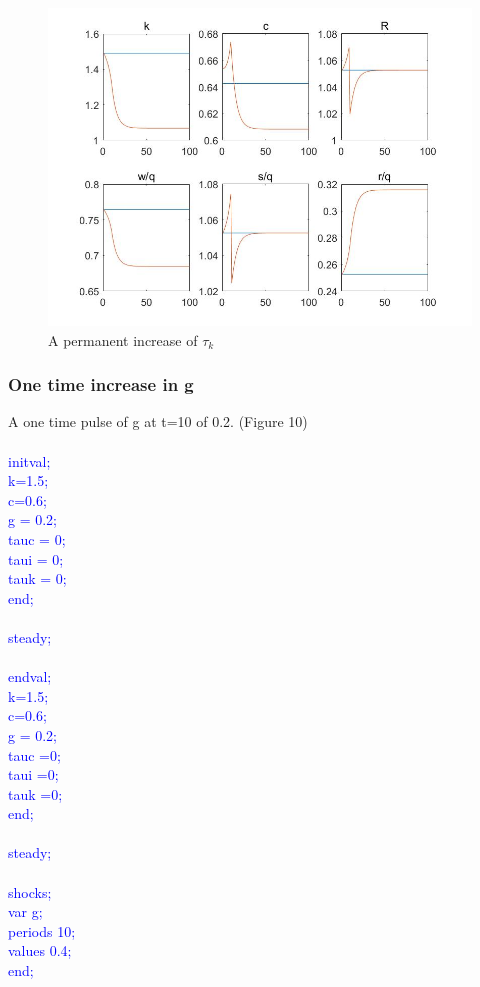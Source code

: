 \documentclass[a4paper,12pt]{scrartcl} %
\begin{document}
\begin{figure}[htbp!]
		\centering
			\includegraphics[width=0.8\linewidth]{fig9.jpg}
            \caption{A permanent increase of $\tau_k$}\label{9}
\end{figure}



\subsubsection{One time increase in g}

A one time pulse of g at t=10 of 0.2. (Figure 10)\\
\\
\textcolor{blue}{
initval;\\
k=1.5;\\
c=0.6;\\
g = 0.2;\\
tauc = 0;\\
taui = 0;\\
tauk = 0;\\
end;\\
\\
steady;\\
\\
endval;\\
k=1.5;\\
c=0.6;\\
g = 0.2;\\
tauc =0;\\
taui =0;\\
tauk =0;\\
end;\\
\\
steady;\\
\\
shocks;\\
var g;\\
periods 10;\\
values 0.4;\\
end;}\\
\end{document}
